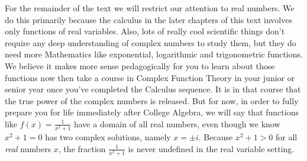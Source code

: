For the remainder of the text we will restrict our attention to real numbers.  We do this primarily because the calculus in the later chapters of this text involves only functions of real variables.  Also, lots of really cool scientific things don't require any deep understanding of complex numbers to study them, but they do need more Mathematics like exponential, logarithmic and trigonometric functions.  We believe it makes more sense pedagogically for you to learn about those functions now then take a course in Complex Function Theory in your junior or senior year once you've completed the Calculus sequence.  It is in that course that the true power of the complex numbers is released.  But for now, in order to fully prepare you for life immediately after College Algebra, we will say that functions like $f(x) = \frac{1}{x^{2} + 1}$ have a domain of all real numbers, even though we know $x^{2} + 1 = 0$ has two complex solutions, namely $x = \pm i$.  Because $x^{2} + 1 > 0$ for all \emph{real} numbers $x$, the fraction $\frac{1}{x^{2} + 1}$ is never undefined in the real variable setting.

